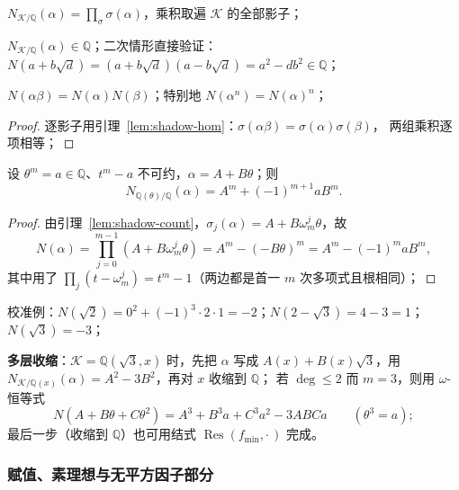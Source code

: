 \documentclass[UTF8,a4paper,11pt]{ctexart}
\begin{document}
\begin{definition}[范数]
\label{def:norm}
$N_{\mathscr{K}/\mathbb{Q}}(\alpha)=\prod_\sigma\sigma(\alpha)$，乘积取遍 $\mathscr{K}$ 的全部影子；
\end{definition}

\begin{lemma}
\label{lem:norm-rational}
$N_{\mathscr{K}/\mathbb{Q}}(\alpha)\in\mathbb{Q}$；二次情形直接验证：
$N(a+b\sqrt d)=(a+b\sqrt d)(a-b\sqrt d)=a^2-db^2\in\mathbb{Q}$；
\end{lemma}

\begin{lemma}[乘性]
\label{lem:norm-mult}
$N(\alpha\beta)=N(\alpha)N(\beta)$；特别地 $N(\alpha^n)=N(\alpha)^n$；
\end{lemma}

\begin{proof}
逐影子用引理~\ref{lem:shadow-hom}：$\sigma(\alpha\beta)=\sigma(\alpha)\sigma(\beta)$，
两组乘积逐项相等；
\end{proof}

\begin{theorem}[两项范数公式]
\label{thm:norm-two-term}
设 $\theta^m=a\in\mathbb{Q}$、$t^m-a$ 不可约，$\alpha=A+B\theta$；则
\[
N_{\mathbb{Q}(\theta)/\mathbb{Q}}(\alpha)=A^m+(-1)^{m+1}aB^m .
\]
\end{theorem}

\begin{proof}
由引理~\ref{lem:shadow-count}，$\sigma_j(\alpha)=A+B\omega_m^j\theta$，故
\[
N(\alpha)=\prod_{j=0}^{m-1}(A+B\omega_m^j\theta)=A^m-(-B\theta)^m=A^m-(-1)^maB^m,
\]
其中用了 $\prod_j(t-\omega_m^j)=t^m-1$（两边都是首一 $m$ 次多项式且根相同）；
\end{proof}

校准例：$N(\sqrt2)=0^2+(-1)^3\cdot2\cdot1=-2$；$N(2-\sqrt3)=4-3=1$；$N(\sqrt3)=-3$；\par

\textbf{多层收缩}：$\mathscr{K}=\mathbb{Q}(\sqrt3,x)$ 时，先把 $\alpha$ 写成
$A(x)+B(x)\sqrt3$，用 $N_{\mathscr{K}/\mathbb{Q}(x)}(\alpha)=A^2-3B^2$，再对 $x$ 收缩到 $\mathbb{Q}$；
若 $\deg\le2$ 而 $m=3$，则用 $\omega$-恒等式
\[
N(A+B\theta+C\theta^2)=A^3+B^3a+C^3a^2-3ABCa\qquad(\theta^3=a);
\]
最后一步（收缩到 $\mathbb{Q}$）也可用结式 $\operatorname{Res}(f_{\min},\cdot\,)$ 完成。\par

\subsubsection{赋值、素理想与无平方因子部分}
\end{document}
